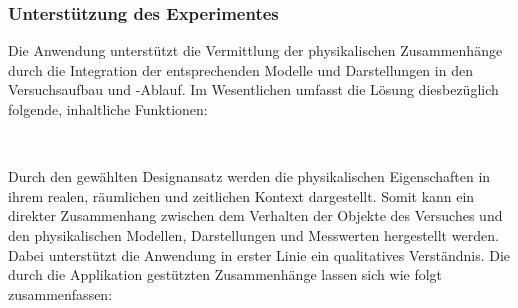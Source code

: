 \subsubsection{Unterstützung des Experimentes}
Die Anwendung unterstützt die Vermittlung der physikalischen Zusammenhänge durch die Integration der entsprechenden Modelle und Darstellungen in den Versuchsaufbau und -Ablauf. Im Wesentlichen umfasst die Lösung diesbezüglich folgende, inhaltliche Funktionen:
\vspace{8px}
\begin{center}
	\\
\end{center}
\vspace{6px}

Durch den gewählten Designansatz werden die physikalischen Eigenschaften in ihrem realen, räumlichen und zeitlichen Kontext dargestellt. Somit kann ein direkter Zusammenhang zwischen dem Verhalten der Objekte des Versuches und den physikalischen Modellen, Darstellungen und Messwerten hergestellt werden. Dabei unterstützt die Anwendung in erster Linie ein qualitatives Verständnis. Die durch die Applikation gestützten Zusammenhänge lassen sich wie folgt zusammenfassen:

